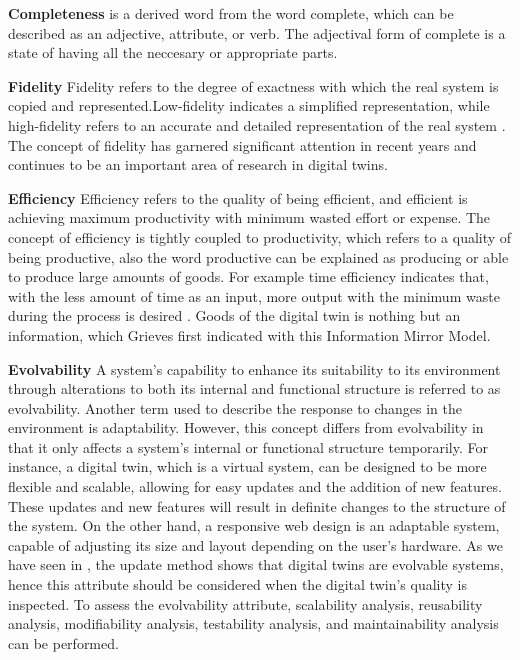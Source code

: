 \documentclass{llncs}
\begin{document}
    \textbf{Completeness} is a derived word from the word complete, which can be described as an adjective, attribute, or verb\cite{OxfordDictionary}. 
    The adjectival form of complete is a state of having all the neccesary or appropriate parts\cite{OxfordDictionary}.

    \textbf{Fidelity}
    Fidelity refers to the degree of exactness with which the real system is copied and represented.Low-fidelity indicates a simplified representation, 
    while high-fidelity refers to an accurate and detailed representation of the real system \cite{Review2}. 
    The concept of fidelity has garnered significant attention in recent years and continues to be an important area of research in digital twins\cite{Review2}\cite{Review1}.

    \textbf{Efficiency}
    Efficiency refers to the  quality of  being efficient, and efficient is achieving
    maximum productivity with minimum wasted effort or expense. The concept of efficiency is tightly coupled to productivity, which  refers to a quality of being productive,
    also  the word productive can be explained as producing or able to produce large amounts of goods\cite{OxfordDictionary}.  
    For example time efficiency indicates that,  with the less amount of time as an input, more output with the minimum 
    waste during the process is desired . Goods of the  digital twin is nothing but an information, which Grieves first 
    indicated with this Information Mirror Model\cite{GrievesPLMBook}.

    \textbf{Evolvability}
    A system's capability to enhance its suitability to its environment through alterations to both its internal and functional 
    structure is referred to as evolvability\cite{MobusSystemTheory}. Another term used to describe the response to changes in the environment is adaptability.
    However, this concept differs from evolvability in that it only affects a system's internal or functional structure temporarily. 
    For instance, a digital twin, which is a virtual system, can be designed to be more flexible and scalable, 
    allowing for easy updates and the addition of new features. 
    These updates and new features will result in definite changes to the structure of the system. 
    On the other hand, a responsive web design is an adaptable system, capable of adjusting its size and layout 
    depending on the user's hardware. As we have seen in \cite{ZHANGUPDATEMETHOD}, the update method shows that digital twins are evolvable systems, 
    hence this attribute should be considered when the digital twin's quality is inspected. To assess the evolvability attribute, scalability analysis,
    reusability analysis, modifiability analysis, testability analysis, and maintainability analysis can be performed. 
\end{document}
